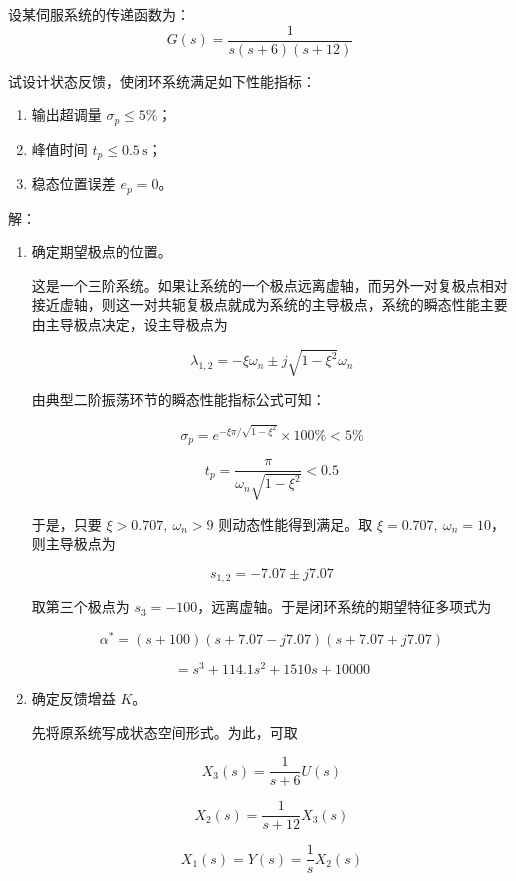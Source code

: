 \begin{example}
    设某伺服系统的传递函数为：
        \[
    G(s)=\frac{1}{s(s+6)(s+12)}
    \]

    试设计状态反馈，使闭环系统满足如下性能指标：

    \begin{enumerate}
    \item 输出超调量 $\sigma_p \leq 5\%$；
    \item 峰值时间 $t_p \leq 0.5\,\mathrm{s}$；
    \item 稳态位置误差 $e_p=0$。
    \end{enumerate}
    \tcblower
    解：\begin{enumerate}
            \item 确定期望极点的位置。

            这是一个三阶系统。如果让系统的一个极点远离虚轴，而另外一对复极点相对接近虚轴，则这一对共轭复极点就成为系统的主导极点，系统的瞬态性能主要由主导极点决定，设主导极点为

            \[
            \lambda_{1,2}=-\xi\omega_n \pm j\sqrt{1-\xi^2}\omega_n
            \]

            由典型二阶振荡环节的瞬态性能指标公式可知：

            \[
            \sigma_p=e^{-\xi\pi/\sqrt{1-\xi^2}}\times 100\% < 5\%
            \]

            \[
            t_p=\frac{\pi}{\omega_n\sqrt{1-\xi^2}}<0.5
            \]

            于是，只要 $\xi>0.707,\ \omega_n>9$ 则动态性能得到满足。取 $\xi=0.707,\ \omega_n=10$，则主导极点为

            \[
            s_{1,2}=-7.07\pm j7.07
            \]

            取第三个极点为 $s_3=-100$，远离虚轴。于是闭环系统的期望特征多项式为

            \[
            \alpha^*=(s+100)(s+7.07-j7.07)(s+7.07+j7.07)
            \]

            \[
            =s^3+114.1s^2+1510s+10000
            \]

            \item 确定反馈增益 $K$。

            先将原系统写成状态空间形式。为此，可取

            \[
            X_3(s)=\frac{1}{s+6}U(s)
            \]

            \[
            X_2(s)=\frac{1}{s+12}X_3(s)
            \]

            \[
            X_1(s)=Y(s)=\frac{1}{s}X_2(s)
            \]


\end{enumerate}
\end{example}
